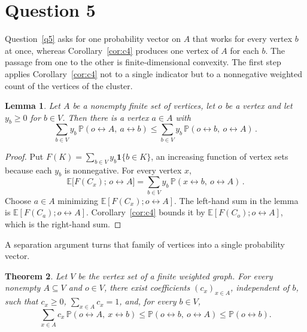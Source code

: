 \documentclass[11pt]{article}
\newtheorem{theorem}{Theorem}[section]
\newtheorem{lemma}[theorem]{Lemma}
\theoremstyle{definition}
\theoremstyle{remark}
\newcommand{\PP}{\mathbb P}
\newcommand{\EE}{\mathbb E}
\newcommand{\one}{\mathbf 1}
\newcommand{\con}{\leftrightarrow}
\begin{document}
\section{Question 5}\label{sec:q5}

Question~\ref{q5} asks for one probability vector on $A$ that works for every vertex $b$ at
once, whereas Corollary~\ref{cor:c4} produces one vertex of $A$ for each $b$. The passage
from one to the other is finite-dimensional convexity. The first step applies
Corollary~\ref{cor:c4} not to a single indicator but to a nonnegative weighted count of the
vertices of the cluster.

\begin{lemma}\label{lem:q5dual}
Let $A$ be a nonempty finite set of vertices, let $o$ be a vertex and let $y_b\geq0$ for
$b\in V$. Then there is a vertex $a\in A$ with
\[
 \sum_{b\in V}y_b\,\PP(o\con A,\ a\con b)\leq \sum_{b\in V}y_b\,\PP(o\con b,\ o\con A)\,.
\]
\end{lemma}

\begin{proof}
Put $F(K)=\sum_{b\in V}y_b\one\{b\in K\}$, an increasing function of vertex sets because
each $y_b$ is nonnegative. For every vertex $x$,
\[
 \EE\bigl[F(C_x);\,o\con A\bigr]=\sum_{b\in V}y_b\,\PP(x\con b,\ o\con A)\,.
\]
Choose $a\in A$ minimizing $\EE[F(C_x);o\con A]$. The left-hand sum in the lemma is
$\EE[F(C_a);o\con A]$. Corollary~\ref{cor:c4} bounds it by
$\EE[F(C_o);o\con A]$, which is the right-hand sum.
\end{proof}

A separation argument turns that family of vertices into a single probability vector.

\begin{theorem}\label{thm:q5}
Let $V$ be the vertex set of a finite weighted graph. For every nonempty
$A\subseteq V$ and $o\in V$, there exist coefficients $(c_x)_{x\in A}$, independent of
$b$, such that $c_x\geq0$, $\sum_{x\in A}c_x=1$, and, for every $b\in V$,
\[
 \sum_{x\in A}c_x\,\PP(o\con A,\ x\con b)
 \leq \PP(o\con b,\ o\con A)\leq \PP(o\con b).
\]
\end{theorem}
\end{document}
